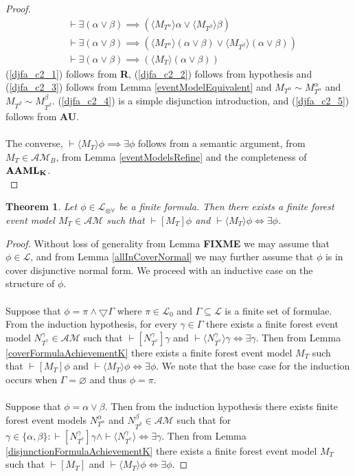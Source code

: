 \documentclass[12pt, a4paper, titlepage]{scrartcl}
\newtheorem{thm}{Theorem}[subsection]
\numberwithin{equation}{section}
\newcommand{\cover}{\bigtriangledown}
\newcommand{\sqex}[1]{[{#1}]}
\newcommand{\anex}[1]{\langle {#1} \rangle}
\newcommand{\lang}{\mathcal{L}}
\newcommand{\langArbAct}{\lang_{\otimes\forall}}
\newcommand{\langProp}{\lang_0}
\newcommand{\AXK}{{\bf K}}
\newcommand{\AXAAML}{${\bf AAML_{\AXK}}$}
\newcommand{\axAU}{{\bf AU}}
\newcommand{\axR}{{\bf R}}
\newcommand{\eventClass}{\mathcal{AM}}
\newcommand{\FIXME}{{\bf FIXME}}
\begin{document}
\begin{proof}
\begin{align}
	&\vdash \exists (\alpha \lor \beta) \implies (\anex{M_{T^\alpha}} \alpha \lor \anex{M_{T^\beta}}
			\beta)\label{djfa_c2_3}\\
	&\vdash \exists (\alpha \lor \beta) \implies (\anex{M_{T^\alpha}} (\alpha \lor \beta) \lor \anex{M_{T^\beta}}
			(\alpha \lor \beta))\label{djfa_c2_4}\\
	&\vdash \exists (\alpha \lor \beta) \implies (\anex{M_T} (\alpha \lor \beta))\label{djfa_c2_5}
\end{align}
(\ref{djfa_c2_1}) follows from \axR, (\ref{djfa_c2_2}) follows from hypothesis and
(\ref{djfa_c2_3}) follows from Lemma \ref{eventModelEquivalent} and $M_{T^\alpha} \sim M^\alpha_{T^\alpha}$ and $M_{T^\beta}
\sim M^\beta_{T^\beta}$.
(\ref{djfa_c2_4}) is a simple disjunction introduction, and (\ref{djfa_c2_5}) follows from \axAU.\\
\\
The converse, $\vdash \anex{M_T} \phi \implies \exists \phi$ follows from a semantic
argument, from $M_T \in \eventClass_B$, from Lemma \ref{eventModelsRefine} and the completeness of \AXAAML.\\
\end{proof}

\begin{thm} \label{goalAchievementK}
Let $\phi \in \langArbAct$ be a finite formula.
Then there exists a finite forest event model $M_T \in \eventClass$ such that
$\vdash \sqex{M_T}\phi$ and $\vdash \anex{ M_T } \phi \iff \exists \phi$.
\end{thm}

\begin{proof}
Without loss of generality from Lemma {\FIXME} we may assume that $\phi \in \lang$, and from Lemma
\ref{allInCoverNormal} we may further assume that $\phi$ is in cover disjunctive normal form.
We proceed with an inductive case on the structure of $\phi$.\\
\\
Suppose that $\phi = \pi \land \cover \Gamma$ where $\pi \in \langProp$ and $\Gamma \subseteq \lang$
is a finite set of formulae.
From the induction hypothesis, for every $\gamma \in \Gamma$ there exists a finite forest event
model $N^\gamma_{T^\gamma} \in \eventClass$ such that $\vdash \sqex{N^\gamma_{T^\gamma}} \gamma$ and
$\vdash \anex{N^\gamma_{T^\gamma}} \gamma \iff \exists \gamma$.
Then from Lemma \ref{coverFormulaAchievementK} there exists a finite forest event model $M_T$ such
that $\vdash \sqex{M_T} \phi$ and $\vdash \anex{M_T} \phi \iff \exists \phi$.
We note that the base case for the induction occurs when $\Gamma = \varnothing$ and thus $\phi =
\pi$.\\
\\
Suppose that $\phi = \alpha \lor \beta$.
Then from the induction hypothesis there exists finite forest event models $N^\alpha_{T^\alpha}$ and
$N^\beta_{T^\beta} \in \eventClass$ such that for $\gamma \in \{\alpha, \beta\}:
\vdash \sqex{N^\gamma_{T^\gamma}} \gamma \land \vdash \anex{N^\gamma_{T^\gamma}} \iff \exists
\gamma$.
Then from Lemma \ref{disjunctionFormulaAchievementK} there exists a finite forest event model $M_T$ such
that $\vdash \sqex{M_T}$ and $\vdash \anex{M_T} \phi \iff \exists \phi$.
\end{proof}
\end{document}
